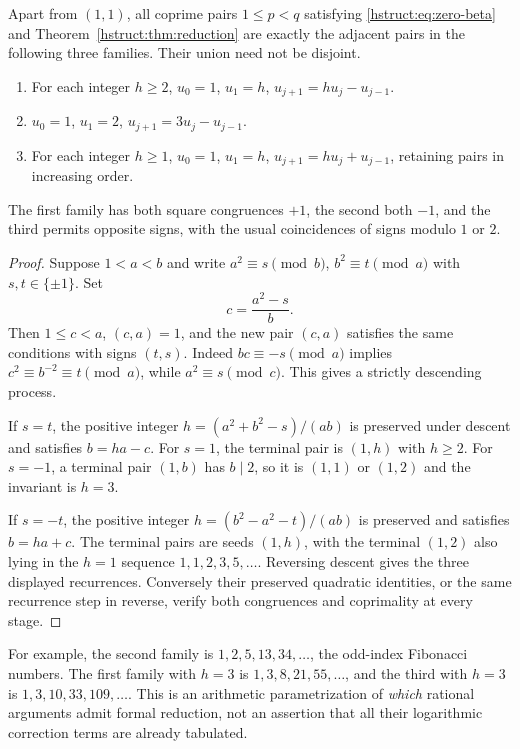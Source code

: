 \begin{theorem}\label{hstruct:thm:recurrences}
Apart from $(1,1)$, all coprime pairs $1\le p<q$ satisfying
\eqref{hstruct:eq:zero-beta} and Theorem~\ref{hstruct:thm:reduction} are exactly the adjacent pairs in the following
three families. Their union need not be disjoint.
\begin{enumerate}
\item For each integer $h\ge2$,
      $u_0=1$, $u_1=h$, $u_{j+1}=h u_j-u_{j-1}$.
\item $u_0=1$, $u_1=2$, $u_{j+1}=3u_j-u_{j-1}$.
\item For each integer $h\ge1$,
      $u_0=1$, $u_1=h$, $u_{j+1}=h u_j+u_{j-1}$,
      retaining pairs in increasing order.
\end{enumerate}
The first family has both square congruences $+1$, the second both
$-1$, and the third permits opposite signs, with the usual coincidences
of signs modulo $1$ or $2$.
\end{theorem}
\begin{proof}
Suppose $1<a<b$ and write
$a^2\equiv s\pmod b$, $b^2\equiv t\pmod a$ with $s,t\in\{\pm1\}$.
Set
\[
 c=\frac{a^2-s}{b}.
\]
Then $1\le c<a$, $(c,a)=1$, and the new pair $(c,a)$ satisfies the same
conditions with signs $(t,s)$. Indeed $bc\equiv-s\pmod a$ implies
$c^2\equiv b^{-2}\equiv t\pmod a$, while $a^2\equiv s\pmod c$.
This gives a strictly descending process.

If $s=t$, the positive integer
$h=(a^2+b^2-s)/(ab)$ is preserved under descent and satisfies
$b=h a-c$. For $s=1$, the terminal pair is $(1,h)$ with $h\ge2$.
For $s=-1$, a terminal pair $(1,b)$ has $b\mid2$, so it is $(1,1)$
or $(1,2)$ and the invariant is $h=3$.

If $s=-t$, the positive integer
$h=(b^2-a^2-t)/(ab)$ is preserved and satisfies $b=h a+c$.
The terminal pairs are seeds $(1,h)$, with the terminal $(1,2)$ also
lying in the $h=1$ sequence $1,1,2,3,5,\ldots$. Reversing descent gives
the three displayed recurrences. Conversely their preserved quadratic
identities, or the same recurrence step in reverse, verify both
congruences and coprimality at every stage.
\end{proof}

For example, the second family is $1,2,5,13,34,\ldots$, the odd-index
Fibonacci numbers. The first family with $h=3$ is
$1,3,8,21,55,\ldots$, and the third with $h=3$ is
$1,3,10,33,109,\ldots$. This is an arithmetic parametrization of
\emph{which} rational arguments admit formal reduction, not an assertion
that all their logarithmic correction terms are already tabulated.


